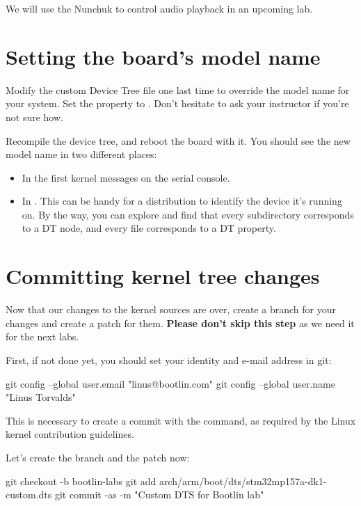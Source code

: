 {We will use the Nunchuk to control audio playback in an upcoming lab.

\section{Setting the board's model name}

Modify the custom Device Tree file one last time to override the model
name for your system. Set the  property to
. Don't hesitate to ask your
instructor if you're not sure how.

Recompile the device tree, and reboot the board with it. You should see
the new model name in two different places:

\begin{itemize}
\item In the first kernel messages on the serial console.
\item In . This can be
      handy for a distribution to identify the device it's running on.
      By the way, you can explore  and
      find that every subdirectory corresponds to a DT node, and every
      file corresponds to a DT property.
\end{itemize}

\section{Committing kernel tree changes}

Now that our changes to the kernel sources are over,
create a branch for your changes and create a patch for them.
{\bf Please don't skip this step} as we need it for the next labs.

First, if not done yet, you should set your identity
and e-mail address in git:

\begin{bashinput}
git config --global user.email "linus@bootlin.com"
git config --global user.name "Linus Torvalds"
\end{bashinput}

This is necessary to create a commit with the 
command, as required by the Linux kernel contribution guidelines.

Let's create the branch and the patch now:

\begin{bashinput}
git checkout -b bootlin-labs
git add arch/arm/boot/dts/stm32mp157a-dk1-custom.dts
git commit -as -m "Custom DTS for Bootlin lab"
\end{bashinput}

}
